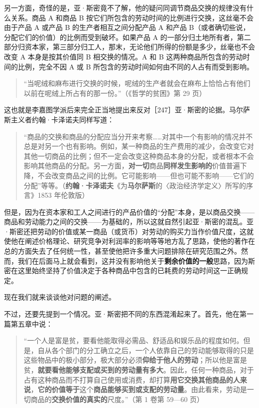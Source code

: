 另一方面，奇怪的是，亚·斯密竟不了解，他的疑问同调节商品交换的规律没有什么关系。商品 A 和商品 B 按它们所包含的劳动时间的比例进行交换，这丝毫不会由于产品 A 或产品 B 的生产者相互之间分配产品 A 和产品 B（或者确切些说，分配它们的价值）的比例而受到破坏。如果产品 A 的一部分归土地所有者，第二部分归资本家，第三部分归工人，那末，无论他们所得的份额是多少，丝毫也不会改变 A 本身是按其价值同 B 相交换的情况。A 和 B 这两种商品所包含的劳动时间的比例，完全不因 A 或 B 所包含的劳动时间如何由不同的人占有而受到影响。

\begin{quote}“当呢绒和麻布进行交换的时候，呢绒的生产者就会在麻布上恰恰占有他们以前在呢绒上所占有的那一份。”（《哲学的贫困》第 29 页）\end{quote}

这也就是李嘉图学派后来完全正当地提出来反对［247］亚·斯密的论据。马尔萨斯主义者约翰·卡泽诺夫同样写道：

\begin{quote}“商品的交换和商品的分配应当分开来考察……对其中一个有影响的情况并不总是对另一个也有影响。例如，某一种商品的生产费用的减少，会改变它对其他一切商品的比例；但不一定会改变这种商品本身的分配，或者根本不会影响其他商品的分配。另一方面，\textbf{对一切}商品\textbf{同样发生影响的}价值普遍下降，不会改变商品之间的比例。它可能影响——但也可能不影响——它们的分配”等等。（\textbf{约翰·卡泽诺夫}《为\textbf{马尔萨斯}的〈政治经济学定义〉所写的序言》1853 年伦敦版）\end{quote}

但是，因为在资本家和工人之间进行的产品价值的“分配”本身，是以商品交换——商品和劳动能力之间的交换——为基础的，所以这就自然引起亚·斯密的混乱。亚·斯密还把劳动的价值或某一商品（或货币）对劳动的购买力当作价值尺度，这就使他在阐述价格理论、研究竞争对利润率的影响等等地方乱了思路，使他的著作在总的方面失去了任何统一性，甚至使他把许多重大问题排除在研究范围之外。然而，我们在后面马上就会看到，这并没有影响他关于\textbf{剩余价值的一般}思路，因为斯密在这里始终坚持了价值决定于各种商品中包含的已耗费的劳动时间这一正确规定。

现在我们就来谈谈他对问题的阐述。

不过，还要先提到一个情况。亚·斯密把不同的东西混淆起来了。首先，他在第一篇第五章中说：

\begin{quote}“一个人是富是贫，要看他能取得必需品、舒适品和娱乐品的程度如何。但是，自从各个部门的分工确立之后，一个人依靠自己的劳动能够取得的只是这些物品中的极小部分，极大部分必须\textbf{仰给于他人的劳动}；所以他是富是贫，\textbf{就要看他能够支配或买到的劳动量有多大}。因此，任何一种商品，对于占有这种商品而不打算自己使用或消费，却打算\textbf{用它交换其他商品的人来说}，\textbf{它的价值等于}这个\textbf{商品能够买到或支配的劳动量}。由此看来，劳动是一切商品的\textbf{交换价值的真实的}尺度。”（第 1 卷第 59—60 页）\end{quote}

